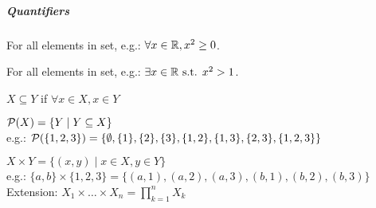\subparagraph{Quantifiers}
\begin{notation}[$\forall$]
	For all elements in set, e.g.: $\forall x \in \mathbb{R}, x^2 \geq 0$.
\end{notation}
\begin{notation}[$\exists$]
For all elements in set, e.g.: $\exists x \in \mathbb{R} \text{ s.t. } x^2 > 1$.
\end{notation}
\begin{definition}
	$X \subseteq Y$ if $\forall x \in X, x \in Y$
\end{definition}
\begin{definition}[Powerset]
	$\mathcal{P}(X) = \{ Y \mid Y \subseteq X \}$\\
	e.g.: $\mathcal{P}(\{1,2,3\})=\{ \emptyset, \{1\},\{2\},\{3\}, \{1,2\},\{1,3\},\{2,3\}, \{1,2,3\} \}$
\end{definition}
\begin{definition}
	$X \times Y = \{ (x,y) \mid x \in X, y \in Y \}$\\
	e.g.: $\{a,b\} \times \{1,2,3\} = \{ (a,1),(a,2),(a,3), (b,1),(b,2),(b,3) \}$\\
	Extension: $X_1 \times \dots \times X_n = \prod_{k=1}^n X_k$
\end{definition}



